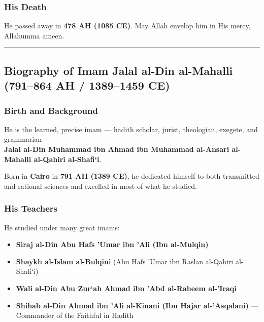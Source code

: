 \documentclass[
  a4paper,
  DIV=11,
  numbers=noendperiod]{scrartcl}
\providecommand{\tightlist}{%
  \setlength{\itemsep}{0pt}\setlength{\parskip}{0pt}}
\begin{document}
\subsubsection{His Death}\label{his-death}

He passed away in \textbf{478 AH (1085 CE)}. May Allah envelop him in
His mercy, Allahumma ameen.

\begin{center}\rule{0.5\linewidth}{0.5pt}\end{center}

\subsection{Biography of Imam Jalal al-Din al-Mahalli (791--864 AH /
1389--1459
CE)}\label{biography-of-imam-jalal-al-din-al-mahalli-791864-ah-13891459-ce}

\subsubsection{Birth and Background}\label{birth-and-background-1}

He is the learned, precise imam --- hadith scholar, jurist, theologian,
exegete, and grammarian ---\\
\textbf{Jalal al-Din Muhammad ibn Ahmad ibn Muhammad al-Ansari
al-Mahalli al-Qahiri al-Shafi`i}.

Born in \textbf{Cairo} in \textbf{791 AH (1389 CE)}, he dedicated
himself to both transmitted and rational sciences and excelled in most
of what he studied.

\subsubsection{His Teachers}\label{his-teachers-1}

He studied under many great imams:

\begin{itemize}
\tightlist
\item
  \textbf{Siraj al-Din Abu Hafs 'Umar ibn 'Ali (Ibn al-Mulqin)}\\
\item
  \textbf{Shaykh al-Islam al-Bulqini} (Abu Hafs 'Umar ibn Raslan
  al-Qahiri al-Shafi`i)\\
\item
  \textbf{Wali al-Din Abu Zur`ah Ahmad ibn 'Abd al-Raheem al-'Iraqi}\\
\item
  \textbf{Shihab al-Din Ahmad ibn 'Ali al-Kinani (Ibn Hajar
  al-'Asqalani)} --- Commander of the Faithful in Hadith
\end{itemize}
\end{document}

